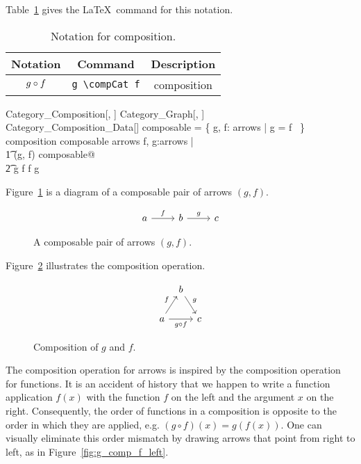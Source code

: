 \documentclass{amsart}
\begin{document}
Table~\ref{table:category_composition_notation} gives the \LaTeX\ command for this notation.

\begin{table}[h!]
\centering
\begin{tabular}{|c|c|c|}
\hline
Notation		& Command		& Description \\
\hline
$g \mathbin{\circ} f$		&\verb|g \compCat f|		& composition \\
\hline
\end{tabular}
\vspace{1ex}
\caption{Notation for composition.}
\label{table:category_composition_notation}
\end{table}

\begin{schema}{Category\_Composition}[\genO, \genA]
	Category\_Graph[\genO, \genA] \\
	Category\_Composition\_Data[\genA]
\where
	composable = \{ g, f: arrows | \domCat g = \codCat f ~\}
\also
	composition \in composable \fun arrows
\also
	\forall f, g:arrows | \\
	\t1	(g, f) \in composable@ \\
	\t2		g \compCat f \in \domCat f \arrCat \codCat g
\end{schema}

Figure~\ref{fig:g_f} is a diagram of a composable pair of arrows $(g, f)$.

\begin{figure}[h!]
$$
  \begin{tikzcd}
    a \arrow{r}{f} & b \arrow{r}{g} & c
  \end{tikzcd}
$$
\caption{A composable pair of arrows $(g, f)$.}
\label{fig:g_f}
\end{figure}

Figure~\ref{fig:g_comp_f} illustrates the composition operation.

\begin{figure}[h!]
$$
\begin{tikzcd}[column sep=tiny]
& b \arrow{rd}{g} & \\
a \arrow{ru}{f} \arrow[swap]{rr}{g \compCat f} & & c
\end{tikzcd}
$$
\caption{Composition of $g$ and $f$.}
\label{fig:g_comp_f}
\end{figure}

The composition operation for arrows is inspired by the composition operation for functions.
It is an accident of history that we happen to write a function application $f(x)$ with the function $f$ on the left and the argument $x$ on the right.
Consequently, the order of functions in a composition is opposite to the order in which they are applied,
e.g. $(g \circ f)(x) = g(f(x))$.
One can visually eliminate this order mismatch by drawing arrows that point from right to left, as in Figure~\ref{fig:g_comp_f_left}.
\end{document}
